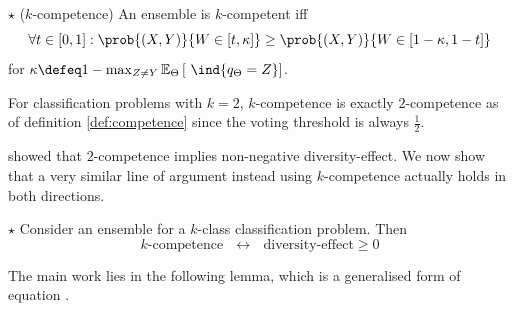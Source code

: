 \documentclass[../main.tex]{subfiles}
\begin{document}
\begin{definition} $\star$ ($k$-competence)
   \label{def:k-competence} 
    An ensemble is $k$-competent iff
$$
\forall t \in [0,1]:
\prob{(X,Y) }{W \in \left[ t, \kappa \right]}
\geq \prob{(X,Y) }{W \in \left[ 1-\kappa, 1-t \right]}
$$
for $ \kappa \defeq 1 - \max_{Z \not= Y} \mathbb{E}_{\Theta}\left[ ~\ind{q_{\Theta} = Z} \right]$.
\end{definition}
For classification problems with $k=2$, $k$-competence is exactly $2$-competence as of definition \ref{def:competence} since the voting threshold is always $\frac{1}{2}$.

\cite{theisen} showed that $2$-competence implies non-negative diversity-effect. 
We now show that a very similar line of argument instead using $k$-competence actually holds in both directions.

\begin{theorem} $\star$ Consider an ensemble for a $k$-class classification problem. Then
$$
\text{$k$-competence}  ~ ~ ~\leftrightarrow~ ~ ~  \text{diversity-effect} \geq 0
$$
\end{theorem}

The main work lies in the following lemma, which is a generalised form of equation \label{eq:competence-lemma2}. 
\end{document}
